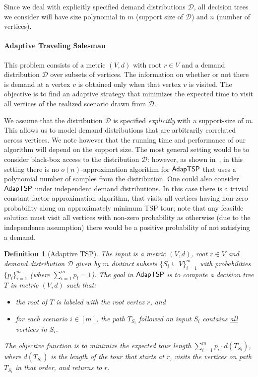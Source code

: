\documentclass[11pt]{article}
\newtheorem{definition}{Definition}
\def\sse{\subseteq}
\def\ds{\mathcal{D}}
\def\stsp{\ensuremath{{\sf AdapTSP}}\xspace}
\begin{document}
\smallskip

Since we deal with explicitly specified demand distributions $\ds$, all decision trees we consider will have size polynomial in $m$ (support size of $\ds$) and $n$ (number of vertices). 





\paragraph{Adaptive Traveling Salesman}
This problem consists of a metric $(V,d)$ with root $r\in V$ and a demand distribution $\ds$ over subsets of
vertices. The  information on whether or not there is demand at a vertex $v$ is
obtained only when that vertex $v$ is visited. The objective is to find an adaptive strategy that minimizes the expected
time to visit all vertices of the realized scenario drawn from $\ds$.

We assume that the distribution $\ds$ is specified {\em explicitly} with a support-size of $m$.
This allows us to model demand distributions that are arbitrarily correlated across vertices. We note however that the
running time and performance of our algorithm will depend on the support size. The most general setting would be to consider black-box access to the distribution $\ds$: however, as shown
in~\cite{Vish-thesis}, in this setting there is no $o(n)$-approximation algorithm for \stsp  
that uses a polynomial number of samples from the distribution.
 One could also consider \stsp under independent demand distributions. In this case there is a trivial constant-factor approximation algorithm, that visits all vertices having non-zero probability along an approximately minimum TSP tour; note that any feasible solution must visit all vertices with non-zero probability as otherwise (due to the independence assumption) there would be a positive probability of not satisfying a demand. 
 
\begin{definition}[Adaptive TSP]\label{def:stsp} The input is a metric $(V,d)$, root $r\in V$ and demand distribution $\ds$
given by $m$ distinct subsets $\{S_i\sse V\}_{i=1}^m$ with probabilities
$\{p_i\}_{i=1}^m$ (where $\sum_{i=1}^m p_i=1$). The goal in \stsp 
is to compute a decision tree $T$ in metric $(V,d)$ such that:
  \begin{itemize}
  \item the root of $T$ is labeled with the root vertex $r$, and
  \item for each scenario $i\in[m]$, the path $T_{S_i}$ followed on input $S_i$
   contains \underline{all} vertices in $S_{i}$.
  \end{itemize}
  The objective function is to minimize the expected tour length
  $\sum_{i=1}^m p_i \cdot d(T_{S_i})$, where $d(T_{S_i})$ is
  the length of the tour that starts at $r$, visits the vertices on path
  $T_{S_i}$ in that order, and returns to $r$.
\end{definition}
\end{document}
